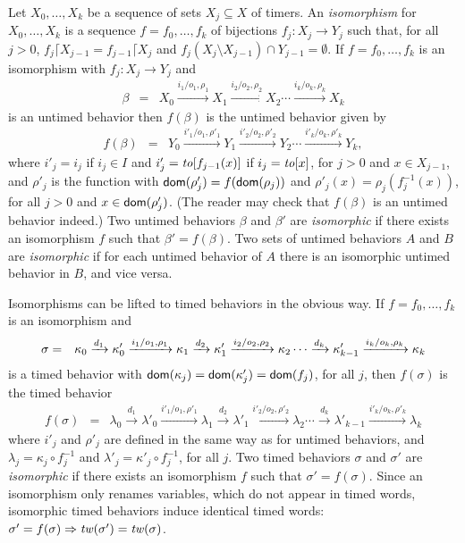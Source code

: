 Let $X_0,\ldots, X_k$ be a sequence of sets $X_j \subseteq X$ of timers.
An \emph{isomorphism} for $X_0,\ldots, X_k$ is a sequence $f = f_0 ,\ldots, f_k$ of bijections $f_j : X_j \rightarrow Y_j$ such that,
for all $j>0$, $f_j \lceil X_{j-1} = f_{j-1} \lceil X_j$ and $f_j (X_j \setminus X_{j-1}) \cap Y_{j-1} = \emptyset$.
If $f = f_0 ,\ldots, f_k$ is an isomorphism with $f_j : X_j \rightarrow Y_j$ and
\begin{eqnarray*}
\beta & = & X_0 \xrightarrow{i_1/o_1, \rho_1} X_1  \xrightarrow{i_2/o_2, \rho_2} X_2 \cdots \xrightarrow{i_k/o_k, \rho_k} X_{k}
\end{eqnarray*}
is an untimed behavior then $f(\beta)$ is the untimed behavior given by
\begin{eqnarray*}
f(\beta) & = & Y_0 \xrightarrow{i'_1/o_1, \rho'_1} Y_1  \xrightarrow{i'_2/o_2, \rho'_2} Y_2 \cdots \xrightarrow{i'_k/o_k, \rho'_k} Y_{k},
\end{eqnarray*}
where 
$i'_j = i_j$ if $i_j \in I$ and $i'_j = \mathit{to}[f_{j-1}(x)]$ if $i_j = \mathit{to}[x]$, for $j>0$ and $x \in X_{j-1}$, and
$\rho'_j$ is the function with ${\textsf{dom}}(\rho'_j) = f({\textsf{dom}}(\rho_j))$ and
$\rho'_j(x) = \rho_j ( f_j^{-1}(x))$, for all $j>0$ and $x\in{\textsf{dom}}(\rho'_j)$.
(The reader may check that $f(\beta)$ is an untimed behavior indeed.)
Two untimed behaviors $\beta$ and $\beta'$ are \emph{isomorphic} if there exists an isomorphism $f$ such that
$\beta' = f(\beta)$.
Two sets of untimed behaviors $A$ and $B$ are \emph{isomorphic} if for each untimed behavior of $A$ there is an isomorphic untimed behavior in $B$,
and vice versa.

Isomorphisms can be lifted to timed behaviors in the obvious way. If $f = f_0 ,\ldots, f_k$ is an isomorphism and
\begin{eqnarray*}
\sigma & = & \kappa_0 \xrightarrow{d_1} \kappa'_0 \xrightarrow{i_1/o_1, \rho_1} \kappa_1 \xrightarrow{d_2} \kappa'_1 \xrightarrow{i_2/o_2, \rho_2} \kappa_2 \cdots
\xrightarrow{d_k} \kappa'_{k-1} \xrightarrow{i_k/o_k, \rho_k} \kappa_{k}
\end{eqnarray*}
is a timed behavior with ${\textsf{dom}}(\kappa_j) = {\textsf{dom}}(\kappa'_j) = {\textsf{dom}}(f_j)$, for all $j$, then $f(\sigma)$ is
the timed behavior
\begin{eqnarray*}
f(\sigma) & = & \lambda_0 \xrightarrow{d_1} \lambda'_0 \xrightarrow{i'_1/o_1, \rho'_1} \lambda_1 \xrightarrow{d_2} \lambda'_1 \xrightarrow{i'_2/o_2, \rho'_2} \lambda_2 \cdots
\xrightarrow{d_k} \lambda'_{k-1} \xrightarrow{i'_k/o_k, \rho'_k} \lambda_{k}
\end{eqnarray*}
where $i'_j$ and $\rho'_j$ are defined in the same way as for untimed behaviors, and
$\lambda_j = \kappa_j \circ f_j^{-1}$ and $\lambda'_j = \kappa'_j \circ f_j^{-1}$, for all $j$.
Two timed behaviors $\sigma$ and $\sigma'$ are \emph{isomorphic} if there exists an isomorphism $f$ such that
$\sigma' = f(\sigma)$.
Since an isomorphism only renames variables, which do not appear in timed words, 
isomorphic timed behaviors induce identical timed words: $\sigma' = f(\sigma) \Rightarrow \mathit{tw}(\sigma') = \mathit{tw}(\sigma)$.

